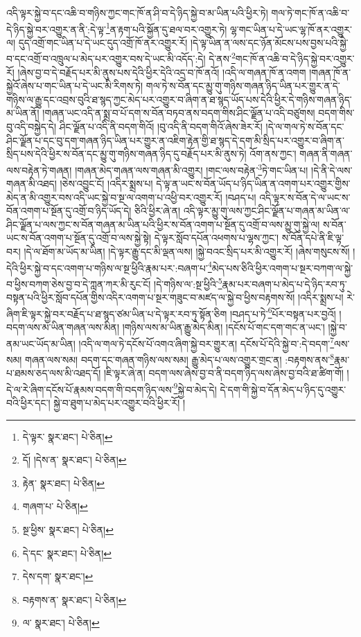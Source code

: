 འདི་ལྟར་སྐྱེ་བ་དང་འཆི་བ་གཉིས་ཀྱང་གང་ཁོ་ན་ཤི་བ་དེ་ཉིད་སྐྱེ་བ་མ་ཡིན་པའི་ཕྱིར་ཏེ། གལ་ཏེ་གང་ཁོ་ན་འཆི་བ་དེ་ཉིད་སྐྱེ་བར་འགྱུར་ན་ནི་:དེ་ལྟ་\footnote{དེ་ལྟར་  སྣར་ཐང་།  པེ་ཅིན། }ན་རྟག་པའི་སྐྱོན་དུ་ཐལ་བར་འགྱུར་ཏེ། ལྷ་གང་ཡིན་པ་དེ་ཡང་ལྷ་ཁོ་ནར་འགྱུར་ལ། དུད་འགྲོ་གང་ཡིན་པ་དེ་ཡང་དུད་འགྲོ་ཁོ་ནར་འགྱུར་རོ། །དེ་ལྟ་ཡིན་ན་ལས་དང་ཉོན་མོངས་པས་བྱས་པའི་སྐྱེ་བ་དང་འགྲོ་བ་འཁྲུལ་པ་མེད་པར་འགྱུར་བས་དེ་ཡང་མི་འདོད་:དེ། དེ་ནས་\footnote{དོ། །དེས་ན་  སྣར་ཐང་།  པེ་ཅིན། }གང་ཁོ་ན་འཆི་བ་དེ་ཉིད་སྐྱེ་བར་འགྱུར་རོ། །ཞེས་བྱ་བ་དེ་བརྗོད་པར་མི་ནུས་པས་དེའི་ཕྱིར་དེའི་འདྲ་བ་ཁོ་ནའོ། །འདི་ལ་གཞན་ཁོ་ན་འགག །གཞན་ཁོ་ན་སྐྱེའོ་ཞེས་པ་གང་ཡིན་པ་དེ་ཡང་མི་རིགས་ཏེ། གལ་ཏེ་ས་བོན་དང་མྱུ་གུ་གཉིས་གཞན་ཉིད་ཡིན་པར་གྱུར་ན་དེ་གཉིས་ལ་རྒྱུ་དང་འབྲས་བུའི་ཐ་སྙད་ཀྱང་མེད་པར་འགྱུར་བ་ཞིག་ན་ཐ་སྙད་ཡོད་པས་དེའི་ཕྱིར་དེ་གཉིས་གཞན་ཉིད་མ་ཡིན་ནོ། །གཞན་ཡང་འདི་ན་སྨྲ་བ་པོ་དག་ས་བོན་བཏབ་ནས་བདག་གིས་ཤིང་ལྗོན་པ་འདི་བཙུགས། བདག་གིས་བུ་འདི་བསྐྱེད་དེ། ཤིང་ལྗོན་པ་འདི་ནི་བདག་གིའོ། །བུ་འདི་ནི་བདག་གིའོ་ཞེས་ཟེར་རོ། །དེ་ལ་གལ་ཏེ་ས་བོན་དང་ཤིང་ལྗོན་པ་དང་བུ་དག་གཞན་ཉིད་ཡིན་པར་གྱུར་ན་འཇིག་རྟེན་གྱི་ཐ་སྙད་དེ་དག་མི་སྲིད་པར་འགྱུར་བ་ཞིག་ན་སྲིད་པས་དེའི་ཕྱིར་ས་བོན་དང་མྱུ་གུ་གཉིས་གཞན་ཉིད་དུ་བརྗོད་པར་མི་ནུས་ཏེ། འོག་ནས་ཀྱང་། གཞན་ནི་གཞན་ལས་བརྟེན་ཏེ་གཞན། །གཞན་མེད་གཞན་ལས་གཞན་མི་འགྱུར། །གང་ལས་བརྟེན་\footnote{རྟེན་  སྣར་ཐང་།  པེ་ཅིན། }ཏེ་གང་ཡིན་པ། །དེ་ནི་དེ་ལས་གཞན་མི་འཐད། །ཅེས་འབྱུང་ངོ། །འདིར་སྨྲས་པ། དེ་ལྟ་ན་ཡང་ས་བོན་ཡོད་པ་ཉིད་ཡིན་ན་འགག་པར་འགྱུར་གྱིས་མེད་ན་མི་འགྱུར་བས་འདི་ཡང་སྐྱེ་བ་སྔ་ལ་འགག་པ་འཕྱི་བར་འགྱུར་རོ། །བཤད་པ། འདི་ལྟར་ས་བོན་དེ་ལ་ཡང་ས་བོན་འགག་པ་སྔོན་དུ་འགྲོ་བ་ཉིད་ཡོད་དེ། ཅིའི་ཕྱིར་ཞེ་ན། འདི་ལྟར་མྱུ་གུ་ལས་ཀྱང་ཤིང་ལྗོན་པ་གཞན་མ་ཡིན་ལ་ཤིང་ལྗོན་པ་ལས་ཀྱང་ས་བོན་གཞན་མ་ཡིན་པའི་ཕྱིར་ས་བོན་འགག་པ་སྔོན་དུ་འགྲོ་བ་ལས་མྱུ་གུ་སྐྱེ་ལ། ས་བོན་ཡང་ས་བོན་འགག་པ་སྔོན་དུ་འགྲོ་བ་ལས་སྐྱེ་སྟེ། དེ་ལྟར་སློབ་དཔོན་འཕགས་པ་ལྷས་ཀྱང་། ས་བོན་དཔེ་ནི་ཇི་ལྟ་བར། །དེ་ལ་ཐོག་མ་ཡོད་མ་ཡིན། །དེ་ལྟར་རྒྱུ་དང་མི་ལྡན་ལས། །སྐྱེ་བའང་སྲིད་པར་མི་འགྱུར་རོ། །ཞེས་གསུངས་སོ། །དེའི་ཕྱིར་སྐྱེ་བ་དང་འགག་པ་གཉིས་ལ་སྔ་ཕྱིའི་རྣམ་པར་:བཞག་པ་\footnote{གཞག་པ་  པེ་ཅིན། }མེད་པས་ཅིའི་ཕྱིར་འགག་པ་སྔར་བཀག་ལ་སྐྱེ་བ་ཕྱིས་བཀག་ཅེས་བྱ་བ་དེ་ཀླན་ཀར་མི་རུང་ངོ། །དེ་གཉིས་ལ་:སྔ་ཕྱིའི་\footnote{སྔ་ཕྱིས་  སྣར་ཐང་།  པེ་ཅིན། }རྣམ་པར་བཞག་པ་མེད་པ་དེ་ཉིད་རབ་ཏུ་བསྟན་པའི་ཕྱིར་སློབ་དཔོན་གྱིས་འདིར་འགག་པ་སྔར་གཟུང་བ་མཛད་ལ་སྐྱེ་བ་ཕྱིས་བརྟགས་སོ། །འདིར་སྨྲས་པ། རེ་ཞིག་ཇི་ལྟར་སྐྱེ་བར་བརྗོད་པ་ཐ་སྙད་ཙམ་ཡིན་པ་དེ་ལྟར་རབ་ཏུ་སྟོན་ཅིག །བཤད་པ་ཏེ་\footnote{དེ་དང་  སྣར་ཐང་།  པེ་ཅིན། }པོར་བསྟན་པར་བྱའོ། །བདག་ལས་མ་ཡིན་གཞན་ལས་མིན། །གཉིས་ལས་མ་ཡིན་རྒྱུ་མེད་མིན། །དངོས་པོ་གང་དག་གང་ན་ཡང་། །སྐྱེ་བ་ནམ་ཡང་ཡོད་མ་ཡིན། །འདི་ལ་གལ་ཏེ་དངོས་པོ་འགའ་ཞིག་སྐྱེ་བར་གྱུར་ན། དངོས་པོ་དེའི་སྐྱེ་བ་:དེ་བདག་\footnote{དེས་དག་  སྣར་ཐང་། }ལས་སམ། གཞན་ལས་སམ། བདག་དང་གཞན་གཉིས་ལས་སམ། རྒྱུ་མེད་པ་ལས་འགྱུར་གྲང་ན། :བརྟགས་ནས་\footnote{བརྟགས་ན་  སྣར་ཐང་།  པེ་ཅིན། }རྣམ་པ་ཐམས་ཅད་ལས་མི་འཐད་དོ། །ཇི་ལྟར་ཞེ་ན། བདག་ལས་ཞེས་བྱ་བ་ནི་བདག་ཉིད་ལས་ཞེས་བྱ་བའི་ཐ་ཚིག་གོ། །དེ་ལ་རེ་ཞིག་དངོས་པོ་རྣམས་བདག་གི་བདག་ཉིད་ལས་\footnote{ལ་  སྣར་ཐང་།  པེ་ཅིན། }སྐྱེ་བ་མེད་དེ། དེ་དག་གི་སྐྱེ་བ་དོན་མེད་པ་ཉིད་དུ་འགྱུར་བའི་ཕྱིར་དང་། སྐྱེ་བ་ཐུག་པ་མེད་པར་འགྱུར་བའི་ཕྱིར་རོ། །
